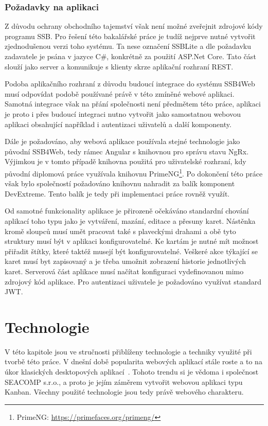 \subsection{Požadavky na aplikaci}
Z důvodu ochrany obchodního tajemství však není možné zveřejnit zdrojové kódy programu SSB. Pro řešení této bakalářské práce je tudíž nejprve nutné vytvořit zjednodušenou verzi toho systému. Ta nese označení SSBLite a dle požadavku zadavatele je psána v jazyce C\#, konkrétně za použití ASP.Net Core. Tato část slouží jako server a komunikuje s klienty skrze aplikační rozhraní REST.

Podoba aplikačního rozhraní z důvodu budoucí integrace do systému SSB4Web musí odpovídat podobě používané právě v této zmíněné webové aplikaci. Samotná integrace však na přání společnosti není předmětem této práce, aplikaci je proto i přes budoucí integraci nutno vytvořit jako samostatnou webovou aplikaci obsahující například i autentizaci uživatelů a další komponenty.

Dále je požadováno, aby webová aplikace používala stejné technologie jako původní SSB4Web, tedy rámec Angular s knihovnou pro správu stavu NgRx. Výjimkou je v tomto případě knihovna použitá pro uživatelské rozhraní, kdy původní diplomová práce využívala knihovnu PrimeNG\footnote{PrimeNG: \url{https://primefaces.org/primeng/}}. Po dokončení této práce však bylo společností požadováno knihovnu nahradit za balík komponent DevExtreme. Tento balík je tedy při implementaci práce rovněž využít.

Od samotné funkcionality aplikace je přirozeně očekáváno standardní chování aplikací toho typu jako je vytváření, mazání, editace a přesuny karet. Nástěnka kromě sloupců musí umět pracovat také s plaveckými drahami a obě tyto struktury musí být v aplikaci konfigurovatelné. Ke kartám je nutné mít možnost přiřadit štítky, které taktéž musejí být konfigurovatelné. Veškeré akce týkající se karet musí byt zapisovaný a je třeba umožnit zobrazení historie jednotlivých karet.
Serverová část aplikace musí načítat konfiguraci vydefinovanou mimo zdrojový kód aplikace. Pro autentizaci uživatele je požadováno využívat standard JWT.




\chapter{Technologie}
V této kapitole jsou ve stručnosti přiblíženy technologie a techniky využité při tvorbě této práce. 
V dnešní době popularita webových aplikací stále roste a to na úkor klasických desktopových aplikací~\cite{bib:web-apps-popular}. Tohoto trendu si je vědoma i společnost SEACOMP s.r.o., a proto je jejím záměrem vytvořit webovou aplikaci typu Kanban. Všechny použité technologie jsou tedy právě webového charakteru.


